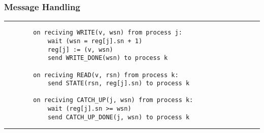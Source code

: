 \begin{frame}[fragile]
    \frametitle{Message Handling}
    \rule{\textwidth}{1pt}
    \scriptsize
    \begin{verbatim}
        on reciving WRITE(v, wsn) from process j:
            wait (wsn = reg[j].sn + 1)
            reg[j] := (v, wsn)
            send WRITE_DONE(wsn) to process k
        
        on reciving READ(v, rsn) from process k:
            send STATE(rsn, reg[j].sn) to process k  
        
        on reciving CATCH_UP(j, wsn) from process k:
            wait (reg[j].sn >= wsn)
            send CATCH_UP_DONE(j, wsn) to process k
    \end{verbatim}
    \rule{\textwidth}{1pt}
\end{frame}